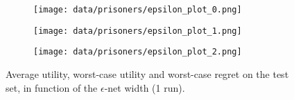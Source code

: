 \begin{figure}
    \centering
    \begin{subfigure}[t]{0.51\linewidth}
    \texttt{[image: data/prisoners/epsilon\_plot\_0.png]}
    \end{subfigure}
    \begin{subfigure}[t]{0.51\linewidth}
    \texttt{[image: data/prisoners/epsilon\_plot\_1.png]}
    \end{subfigure}
    \begin{subfigure}[t]{0.51\linewidth}
    \texttt{[image: data/prisoners/epsilon\_plot\_2.png]}
    \end{subfigure}
    \caption{Average utility, worst-case utility and worst-case regret on the test set, in function of the $\epsilon$-net width (1 run).}
    \label{fig:prisoners.epsilon_plot}
\end{figure}